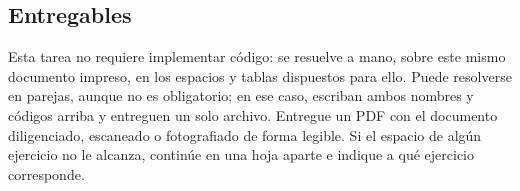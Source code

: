 \subsection{Entregables}

Esta tarea no requiere implementar código: se resuelve a mano, sobre este mismo documento impreso, en los espacios y tablas dispuestos para ello. Puede resolverse en parejas, aunque no es obligatorio; en ese caso, escriban ambos nombres y códigos arriba y entreguen un solo archivo. Entregue un PDF con el documento diligenciado, escaneado o fotografiado de forma legible. Si el espacio de algún ejercicio no le alcanza, continúe en una hoja aparte e indique a qué ejercicio corresponde.
